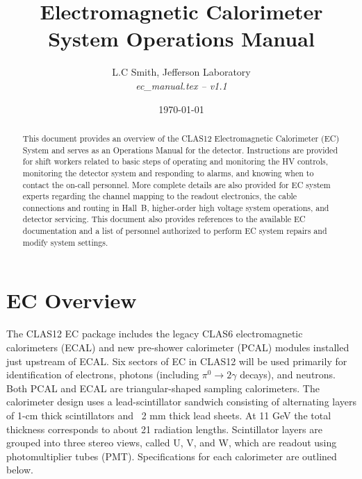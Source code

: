 \documentclass[letterpaper,10pt]{article}
\begin{document}
\title{Electromagnetic Calorimeter System Operations Manual}

\vskip 0.5cm

\author{L.C Smith, Jefferson Laboratory\\[0.2ex]
{\it ec\_manual.tex -- v1.1}}

\date \today
%
\maketitle

\begin{abstract}
This document provides an overview of the CLAS12 Electromagnetic Calorimeter (EC) System and serves 
as an Operations Manual for the detector. Instructions are provided for shift workers related to 
basic steps of operating and monitoring the HV controls, monitoring the detector system and 
responding to alarms, and knowing when to contact the on-call personnel. More complete details 
are also provided for EC system experts regarding the channel mapping to the readout electronics, 
the cable connections and routing in Hall~B, higher-order high voltage system operations, and 
detector servicing. This document also provides references to the available EC documentation and 
a list of personnel authorized to perform EC system repairs and modify system settings.
\end{abstract}

\thispagestyle{empty}

\clearpage

\vfil
\eject

\tableofcontents

\vfil
\eject

\section{EC Overview}
\label{intro}

The CLAS12 EC package includes the legacy CLAS6 electromagnetic calorimeters (ECAL) and new pre-shower
calorimeter (PCAL) modules installed just upstream of ECAL.  Six sectors of EC in CLAS12 will be used
primarily for identification of electrons, photons (including $\pi^0\rightarrow 2\gamma$ decays), and
neutrons.
Both PCAL and ECAL are triangular-shaped sampling calorimeters. The calorimeter design uses
a lead-scintillator sandwich consisting of alternating layers of 1-cm thick scintillators and ~2 mm thick
lead sheets. At 11 GeV the total thickness corresponds to about 21 radiation lengths. Scintillator layers
are grouped into three stereo views, called U, V, and W,  which are readout using photomultiplier tubes (PMT).
Specifications for each calorimeter are outlined below. 
\end{document}
